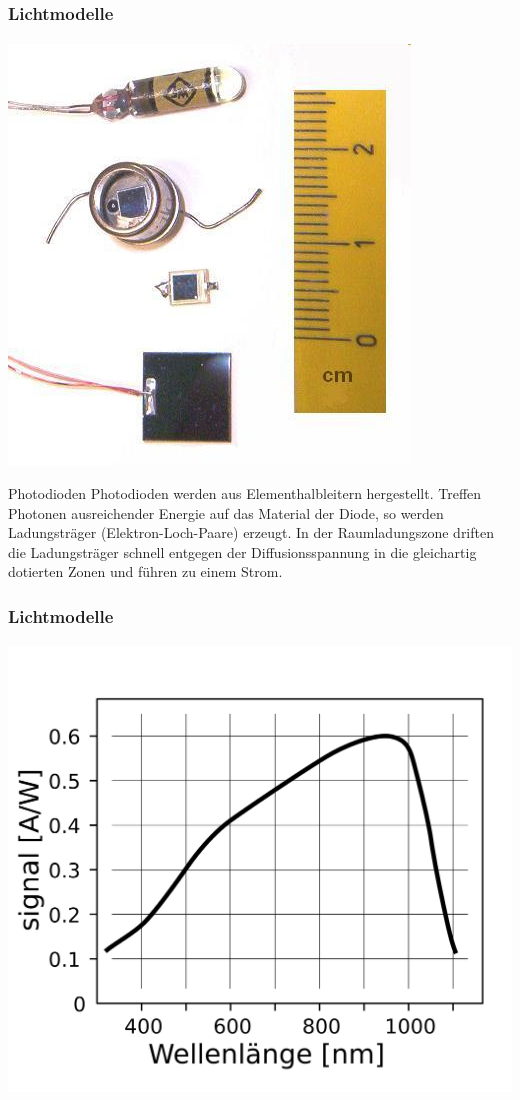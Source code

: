 \documentclass{beamer}
\begin{document}
\begin{frame}
    \frametitle{Lichtmodelle}
\framesubtitle{}
\begin{center}
\includegraphics[scale=0.9]{images/Fotodiode}
\end{center}
    \begin{block}{Photodioden}
Photodioden werden aus Elementhalbleitern hergestellt.
Treffen Photonen ausreichender Energie auf das Material der Diode, so werden Ladungsträger (Elektron-Loch-Paare) erzeugt. 
In der Raumladungszone driften die Ladungsträger schnell entgegen der Diffusionsspannung in die gleichartig dotierten Zonen und führen zu einem Strom. 
\end{block}
\end{frame}


\begin{frame}
    \frametitle{Lichtmodelle}
\framesubtitle{}
\begin{center}
\includegraphics[scale=0.1]{images/photodiode_strom}
\end{center}

\end{frame}
\end{document}
